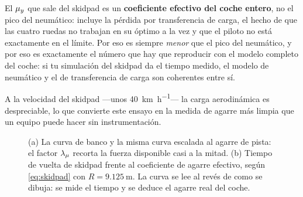 \begin{clave}
El $\mu_y$ que sale del skidpad es un \textbf{coeficiente efectivo del coche
entero}, no el pico del neumático: incluye la pérdida por transferencia de carga,
el hecho de que las cuatro ruedas no trabajan en su óptimo a la vez y que el
piloto no está exactamente en el límite. Por eso es siempre \emph{menor} que el
pico del neumático, y por eso es exactamente el número que hay que reproducir con
el modelo completo del coche: si tu simulación del skidpad da el tiempo medido,
el modelo de neumático y el de transferencia de carga son coherentes entre sí.

A la velocidad del skidpad ---unos \SI{40}{\kilo\meter\per\hour}--- la carga
aerodinámica es despreciable, lo que convierte este ensayo en la medida de agarre
más limpia que un equipo puede hacer sin instrumentación.
\end{clave}

\begin{figure}[htbp]
\centering
{}%
\hfill
{}
\caption[Escalado del modelo y calibración con el skidpad]{(a) La curva de banco
y la misma curva escalada al agarre de pista: el factor $\lambda_{\mu}$ recorta la fuerza
disponible casi a la mitad. (b) Tiempo de vuelta de skidpad frente al coeficiente
de agarre efectivo, según \eqref{eq:skidpad} con $R=\SI{9.125}{\meter}$. La curva
se lee al revés de como se dibuja: se mide el tiempo y se deduce el agarre real
del coche.}
\label{fig:modelado:escala}
\end{figure}

